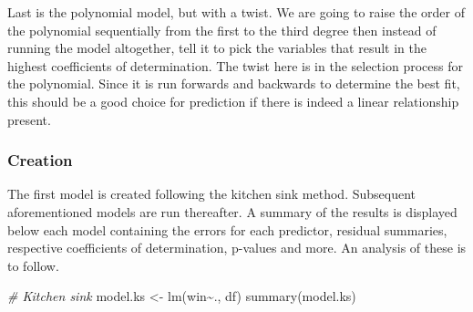 \documentclass[
]{article}
\newenvironment{Shaded}{\begin{snugshade}}{\end{snugshade}}
\newcommand{\CommentTok}[1]{\textcolor[rgb]{0.56,0.35,0.01}{\textit{#1}}}
\newcommand{\FunctionTok}[1]{\textcolor[rgb]{0.00,0.00,0.00}{#1}}
\newcommand{\NormalTok}[1]{#1}
\newcommand{\OtherTok}[1]{\textcolor[rgb]{0.56,0.35,0.01}{#1}}
\newcommand{\SpecialCharTok}[1]{\textcolor[rgb]{0.00,0.00,0.00}{#1}}
\begin{document}
Last is the polynomial model, but with a twist. We are going to raise
the order of the polynomial sequentially from the first to the third
degree then instead of running the model altogether, tell it to pick the
variables that result in the highest coefficients of determination. The
twist here is in the selection process for the polynomial. Since it is
run forwards and backwards to determine the best fit, this should be a
good choice for prediction if there is indeed a linear relationship
present.

\hypertarget{creation}{%
\subsubsection{Creation}\label{creation}}

The first model is created following the kitchen sink method. Subsequent
aforementioned models are run thereafter. A summary of the results is
displayed below each model containing the errors for each predictor,
residual summaries, respective coefficients of determination, p-values
and more. An analysis of these is to follow.

\begin{Shaded}
\begin{Highlighting}[]
\CommentTok{\# Kitchen sink}
\NormalTok{model.ks }\OtherTok{\textless{}{-}} \FunctionTok{lm}\NormalTok{(win}\SpecialCharTok{\textasciitilde{}}\NormalTok{., df)}
\FunctionTok{summary}\NormalTok{(model.ks)}
\end{Highlighting}
\end{Shaded}
\end{document}
